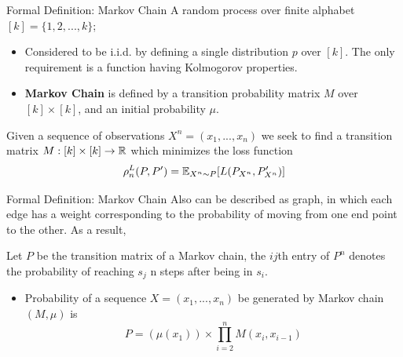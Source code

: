 \documentclass{beamer}
\newcommand{\R}{\Bbb{R}}
\newcommand{\E}{\Bbb{E}}
\begin{document}
	\begin{frame}{Formal Definition: Markov Chain}
		A random process over finite alphabet $[k] = \{ 1 , 2 , ... , k \}$;
		\begin{itemize}
			\item Considered to be i.i.d. by defining a single distribution $p$ over $[k]$. The only requirement is a function having Kolmogorov properties.
			\item \textbf{Markov Chain} is defined by a transition probability matrix $M$ over $[k]\times [k]$, and an initial probability $\mu$. 
		\end{itemize}\pause
		Given a sequence of observations $X^n = (x_1 , ... , x_n)$ we seek to find a transition matrix $M:[k]\times[k]\rightarrow \R$ which minimizes the loss function \[ \rho_n^L(P , P') = \E_{X^n \sim P} [L(P_{X^n}, P'_{X^n})] \]
	\end{frame}



	\begin{frame}{Formal Definition: Markov Chain}
		Also can be described as graph, in which each edge has a weight corresponding to the probability of moving from one end point to the other. \pause As a result, 
		
		\begin{theorem}
			Let $P$ be the transition matrix of a Markov chain, the $ij$th entry of $P^{n}$ denotes the probability of reaching $s_j$ n steps after being in $s_i$.
		\end{theorem} \pause
	
			\begin{itemize}
			\item Probability of a sequence $X = (x_1 , ... , x_n)$ be generated by Markov chain $(M , \mu)$ is \[
			P = (\mu(x_1))\times \prod_{i = 2}^{n}M(x_i , x_{i - 1})
			\]
		\end{itemize}
	\end{frame}
\end{document}
